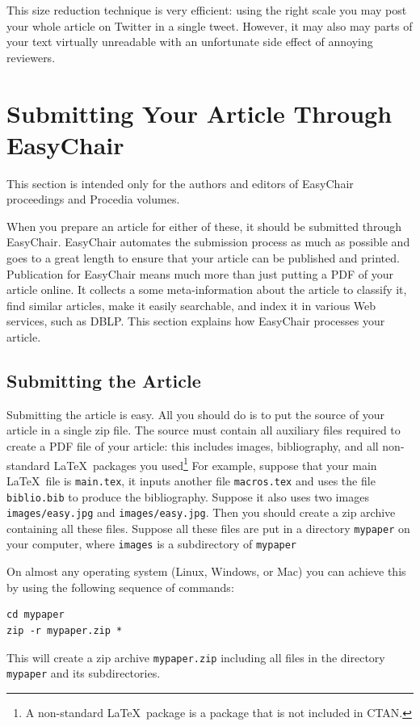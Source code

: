 \documentclass{easychair}
\begin{document}
This size reduction technique is very efficient: using the right scale
you may post your whole article on Twitter in a single tweet. However,
it may also may parts of your text virtually unreadable with an
unfortunate side effect of annoying reviewers. 

\section{Submitting Your Article Through EasyChair}

This section is intended only for the authors and editors of EasyChair
proceedings and Procedia volumes. 

When you prepare an article for either of these, it should be
submitted through EasyChair. EasyChair automates the submission
process as much as possible and goes to a great length to ensure that
your article can be published and printed. Publication for EasyChair
means much more than just putting a PDF of your article online. It
collects a some meta-information about the article to classify it,
find similar articles, make it easily searchable, and index it in
various Web services, such as DBLP. This section explains how
EasyChair processes your article. 

\subsection{Submitting the Article}

Submitting the article is easy. All you should do is to put the source
of your article in a single zip file. The source must contain all
auxiliary files required to create a PDF file of your article: this
includes images, bibliography, and all non-standard \LaTeX\ packages
you used\footnote{ 
  A non-standard \LaTeX\ package is a package that is not included in
  CTAN. 
} For example, suppose that your main \LaTeX\ file is
\texttt{main.tex}, it inputs another file \texttt{macros.tex} and uses
the file \texttt{biblio.bib} to produce the bibliography. Suppose it
also uses two images \texttt{images/easy.jpg} and
\texttt{images/easy.jpg}. Then you should create a zip archive
containing all these files. Suppose all these files are put in a
directory \texttt{mypaper} on your computer, where \texttt{images} is
a subdirectory of \texttt{mypaper}

On almost any operating system (Linux,
Windows, or Mac) you can achieve this by using the following sequence
of commands:

\begin{verbatim}
cd mypaper
zip -r mypaper.zip *
\end{verbatim}
This will create a zip archive \texttt{mypaper.zip} including all
files in the directory \texttt{mypaper} and its subdirectories. 
\end{document}
